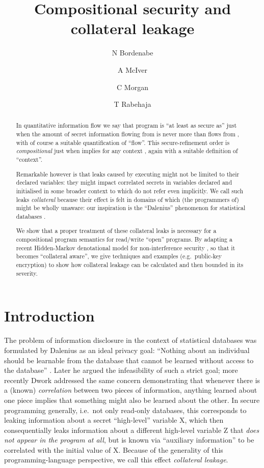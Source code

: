 \documentclass[a4paper,UKenglish]{lipics}
\title{Compositional security  and collateral leakage}
\author[1]{N Bordenabe}
\author[1]{A McIver}
\author[2]{C Morgan}
\author[1]{T Rabehaja}
\affil[1] {Dept. Computing,
 Macquarie University, Sydney}
\affil[2]{Data61 \& UNSW,
  Sydney}
\begin{document}
\maketitle

\begin{abstract}
In quantitative information flow we say that program  is ``at least as secure as''  just when the amount of secret information flowing from  is never more than flows from , with of course a suitable quantification of ``flow''.  
This secure-refinement order  is \emph{compositional} just when  implies  for any context , again with a suitable definition of ``context''.

Remarkable however is that leaks caused by executing  might not be limited to their declared variables: they might impact  correlated secrets in variables declared and initialised in some broader context to which  do not refer even implicitly. We call such  leaks \emph{collateral} because their effect is felt in domains of which (the programmers of)  might be wholly unaware: our inspiration is the ``Dalenius'' phenomenon for  statistical databases \cite{Dalenius:1977aa,Dwork:2006aa}. 

We show that a proper treatment of these collateral leaks is necessary for a compositional program semantics for read/write ``open'' programs. By adapting a recent Hidden-Markov denotational model for non-interference security \cite{McIver:2014ab,McIver:15}, so that it becomes ``collateral aware'', we give techniques and examples (e.g.\ public-key encryption) to show how collateral leakage can be calculated and then bounded in its severity.
\end{abstract}

\section{Introduction}\label{s1336}

The problem of information disclosure in the context of statistical databases was formulated by Dalenius as an ideal privacy goal: 
``Nothing about an individual should be learnable from the database that cannot be learned without access to the database''
\cite{Dalenius:1977aa}.  Later he  argued the infeasibility of such a strict goal; more recently Dwork \cite{Dwork:2006aa} addressed the same concern
demonstrating that 
whenever there is a (known)  \emph{correlation} between two pieces of information, anything learned about one piece implies that something might also be learned about the other.  In secure programming generally, i.e.\ not only read-only databases, this corresponds to leaking information about a secret ``high-level'' variable {\Pf X}, which then consequentially leaks information about a different high-level variable {\Pf Z} that \emph{does not appear in the program at all}, but is known via ``auxiliary information'' to be correlated with the initial value of {\Pf X}. Because of the generality of this programming-language perspective, we call this effect \label{g13928}\emph{collateral leakage}.
 
\end{document}
